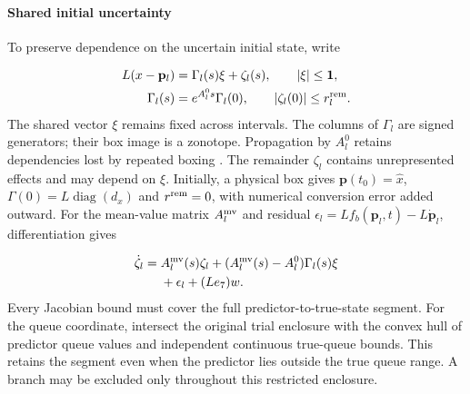 \documentclass[preprint,12pt]{elsarticle}
\theoremstyle{definition}
\theoremstyle{plain}
\theoremstyle{definition}
\theoremstyle{plain}
\begin{document}
\paragraph{Shared initial uncertainty}
To preserve dependence on the uncertain initial state, write

\begin{equation}
 \begin{aligned}
 L(x-\mathbf{p}_l)&=\Gamma_l(s)\xi+\zeta_l(s),\qquad |\xi|\le\mathbf1,\\
 \Gamma_l(s)&=e^{A_l^0s}\Gamma_l(0),\qquad |\zeta_l(0)|\le r_l^{\rm rem}.
 \end{aligned}
 \label{eq:structure-affine-set}
\end{equation}
The shared vector $\xi$ remains fixed across intervals. The columns of
$\Gamma_l$ are signed generators; their box image is a zonotope.
Propagation by $A_l^0$ retains dependencies lost by repeated boxing
\cite{kochdumper2021sparse}. The remainder $\zeta_l$ contains unrepresented
effects and may depend on $\xi$. Initially, a physical box gives
$\mathbf p(t_0)=\widehat x$, $\Gamma(0)=L\operatorname{diag}(d_x)$ and
$r^{\rm rem}=0$, with numerical conversion error added outward.
For the mean-value matrix $A_l^{\rm mv}$ and residual
$\epsilon_l=Lf_b(\mathbf p_l,t)-L\dot{\mathbf p}_l$, differentiation gives

\begin{equation}
 \begin{aligned}
 \dot\zeta_l={}&A_l^{\rm mv}(s)\zeta_l+(A_l^{\rm mv}(s)-A_l^0)\Gamma_l(s)\xi\\
              &+\epsilon_l+(Le_7)w.
 \end{aligned}
 \label{eq:structure-remainder-identity}
\end{equation}
Every Jacobian bound must cover the full predictor-to-true-state segment.
For the queue coordinate, intersect the original trial enclosure with the
convex hull of predictor queue values and independent continuous true-queue
bounds. This retains the segment even when the predictor lies outside the
true queue range. A branch may be excluded only throughout this restricted
enclosure.
\end{document}

